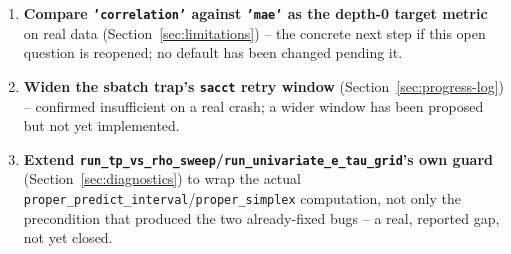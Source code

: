 \documentclass[11pt]{article}
\begin{document}
\begin{enumerate}[leftmargin=1.4em]
  \item \textbf{Compare \texttt{'correlation'} against \texttt{'mae'} as the depth-0 target metric} on real data (Section~\ref{sec:limitations}) -- the concrete next step if this open question is reopened; no default has been changed pending it.
  \item \textbf{Widen the sbatch trap's \texttt{sacct} retry window} (Section~\ref{sec:progress-log}) -- confirmed insufficient on a real crash; a wider window has been proposed but not yet implemented.
  \item \textbf{Extend \texttt{run\_tp\_vs\_rho\_sweep}/\texttt{run\_univariate\_e\_tau\_grid}'s own guard} (Section~\ref{sec:diagnostics}) to wrap the actual \texttt{proper\_predict\_interval}/\texttt{proper\_simplex} computation, not only the precondition that produced the two already-fixed bugs -- a real, reported gap, not yet closed.
\end{enumerate}

\newpage
\end{document}

